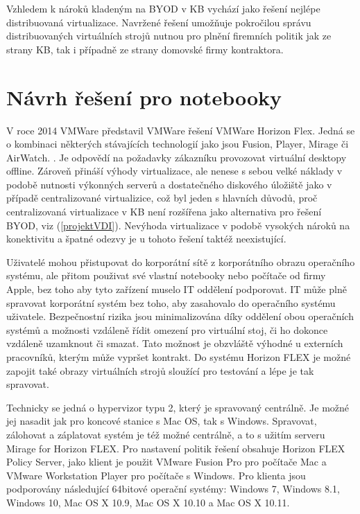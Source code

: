 
Vzhledem k nároků kladeným na BYOD v KB vychází jako řešení nejlépe distribuovaná virtualizace. Navržené řešení umožňuje pokročilou správu distribuovaných virtuálních strojů nutnou pro plnění firemních politik jak ze strany KB, tak i případně ze strany domovské firmy kontraktora.

\section{Návrh řešení pro notebooky}

V roce 2014 VMWare představil VMWare řešení VMWare Horizon Flex. Jedná se o kombinaci některých stávajících technologií jako jsou Fusion, Player, Mirage či AirWatch. . Je odpovědí na požadavky zákazníku provozovat virtuální desktopy offline. Zároveň přináší výhody virtualizace, ale nenese s sebou velké náklady v podobě nutnosti výkonných serverů a dostatečného diskového úložiště jako v případě centralizované virtualizice, což byl jeden s hlavních důvodů, proč centralizovaná virtualizace v KB není rozšířena jako alternativa pro řešení BYOD, viz (\ref{projektVDI}). Nevýhoda virtualizace v podobě vysokých nároků na konektivitu a špatné odezvy je u tohoto řešení taktéž neexistující. 

Uživatelé mohou přistupovat do korporátní sítě z korporátního obrazu operačního systému, ale přitom použivat své vlastní notebooky nebo počítače od firmy Apple, bez toho aby tyto zařízení muselo IT oddělení podporovat. IT může plně spravovat korporátní systém bez toho, aby zasahovalo do operačního systému uživatele. Bezpečnostní rizika jsou minimalizována díky oddělení obou operačních systémů a možnosti vzdáleně řídit omezení pro virtuální stoj, či ho dokonce vzdáleně uzamknout či smazat. Tato možnost je obzvláště výhodné u externích pracovníků, kterým může vypršet kontrakt. Do systému Horizon FLEX je možné zapojit také obrazy virtuálních strojů sloužící pro testování a lépe je tak spravovat.

Technicky se jedná o hypervizor typu 2, který je spravovaný centrálně. Je možné jej nasadit jak pro koncové stanice s Mac OS, tak s Windows. Spravovat, zálohovat a záplatovat systém je též možné centrálně, a to s užitím serveru Mirage for Horizon FLEX. Pro nastavení politik řešení obsahuje Horizon FLEX Policy Server, jako klient je použit VMware Fusion Pro pro počítače Mac a VMware Workstation Player pro počítače s Windows.   Pro klienta jsou podporovány následující 64bitové operační systémy: Windows 7, Windows 8.1, Windows 10, Mac OS X 10.9, Mac OS X 10.10 a Mac OS X 10.11.

